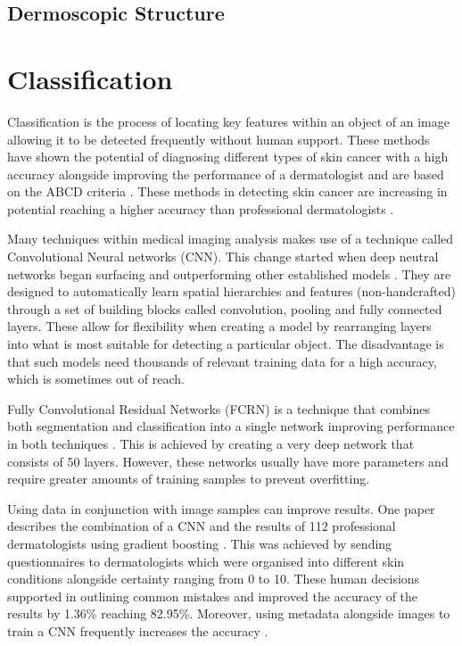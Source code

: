 \documentclass[12pt]{report}
\begin{document}
\subsection{Dermoscopic Structure}

\section{Classification}
Classification is the process of locating key features within an object of an image allowing it to be detected frequently without human support. These methods have shown the potential of diagnosing different types of skin cancer with a high accuracy alongside improving the performance of a dermatologist \cite{M.A.2020} and are based on the ABCD criteria \cite{Clawson2007, Celebi2014a, Rajesh2017a}. These methods in detecting skin cancer are increasing in potential reaching a higher accuracy than professional dermatologists \cite{Andre2017}.

Many techniques within medical imaging analysis makes use of a technique called Convolutional Neural networks (CNN). This change started when deep neutral networks began surfacing and outperforming other established models \cite{Lundervold2019}. They are designed to automatically learn spatial hierarchies and features (non-handcrafted) through a set of building blocks called convolution, pooling and fully connected layers. These allow for flexibility \cite{Mikoajczyk2018} when creating a model by rearranging layers into what is most suitable for detecting a particular object. The disadvantage is that such models need thousands of relevant training data for a high accuracy, which is sometimes out of reach.

Fully Convolutional Residual Networks (FCRN) is a technique that combines both segmentation and classification into a single network improving performance in both techniques \cite{Prathiba2019}. This is achieved by creating a very deep network that consists of 50 layers. However, these networks usually have more parameters and require greater amounts of training samples to prevent overfitting. 

Using data in conjunction with image samples can improve results. One paper describes the combination of a CNN and the results of 112 professional dermatologists using gradient boosting \cite{Hekler2019}. This was achieved by sending questionnaires to dermatologists which were organised into different skin conditions alongside certainty ranging from 0 to 10. These human decisions supported in outlining common mistakes and improved the accuracy of the results by 1.36\% reaching 82.95\%. Moreover, using metadata alongside images to train a CNN frequently increases the accuracy \cite{Liu2013a, Hagerty2019a,Ruiz-Castilla2019a}.
\end{document}
